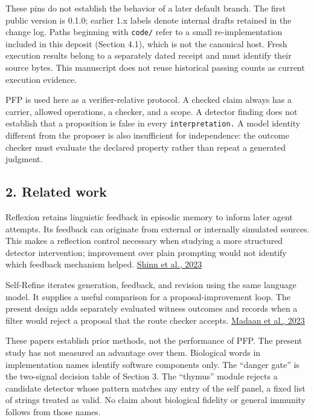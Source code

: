 \documentclass[
  11pt,
]{article}
\newcommand{\passthrough}[1]{#1}
\begin{document}
These pins do not establish the behavior of a later default branch. The
first public version is 0.1.0; earlier 1.x labels denote internal drafts
retained in the change log. Paths beginning with
\passthrough{\lstinline!code/!} refer to a small re-implementation
included in this deposit (Section 4.1), which is not the canonical host.
Fresh execution results belong to a separately dated receipt and must
identify their source bytes. This manuscript does not reuse historical
passing counts as current execution evidence.

PFP is used here as a verifier-relative protocol. A checked claim always
has a carrier, allowed operations, a checker, and a scope. A detector
finding does not establish that a proposition is false in every
\nolinkurl{interpretation.} A model identity different from the proposer
is also insufficient for independence: the outcome checker must evaluate
the declared property rather than repeat a generated judgment.

\subsection{2. Related work}\label{related-work}

Reflexion retains linguistic feedback in episodic memory to inform later
agent attempts. Its feedback can originate from external or internally
simulated sources. This makes a reflection control necessary when
studying a more structured detector intervention; improvement over plain
prompting would not identify which feedback mechanism helped.
\href{https://arxiv.org/abs/2303.11366v4}{Shinn et al., 2023}

Self-Refine iterates generation, feedback, and revision using the same
language model. It supplies a useful comparison for a
proposal-improvement loop. The present design adds separately evaluated
witness outcomes and records when a filter would reject a proposal that
the route checker accepts.
\href{https://arxiv.org/abs/2303.17651v2}{Madaan et al., 2023}

These papers establish prior methods, not the performance of PFP. The
present study has not measured an advantage over them. Biological words
in implementation names identify software components only. The ``danger
gate'' is the two-signal decision table of Section 3. The ``thymus''
module rejects a candidate detector whose pattern matches any entry of
the self panel, a fixed list of strings treated as valid. No claim about
biological fidelity or general immunity follows from those names.
\end{document}
